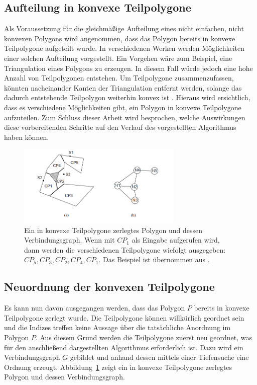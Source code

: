 \documentclass[ngerman]{seminarbeitrag}
\begin{document}
\subsection{Aufteilung in konvexe Teilpolygone}\label{aufteilung}
Als Voraussetzung für die gleichmäßige Aufteilung eines nicht einfachen, nicht konvexen Polygons wird angenommen, dass das Polygon bereits in konvexe Teilpolygone aufgeteilt wurde. In verschiedenen Werken werden Möglichkeiten einer solchen Aufteilung vorgestellt. Ein Vorgehen wäre zum Beispiel, eine Triangulation eines Polygons zu erzeugen. In diesem Fall würde jedoch eine hohe Anzahl von Teilpolygonen entstehen. Um Teilpolygone zusammenzufassen, könnten nacheinander Kanten der Triangulation entfernt werden, solange das dadurch entstehende Teilpolygon weiterhin konvex ist \cite{Schachter.1978}.
Hieraus wird ersichtlich, dass es verschiedene Möglichkeiten gibt, ein Polygon in konvexe Teilpolygone aufzuteilen. Zum Schluss dieser Arbeit wird besprochen, welche Auswirkungen diese vorbereitenden Schritte auf den Verlauf des vorgestellten Algorithmus haben können.

\begin{figure}[hb]
    \includegraphics[width=0.70\textwidth]{./Abbildungen/6.png}
    \centering
    \caption{Ein in konvexe Teilpolygone zerlegtes Polygon und dessen Verbindungsgraph. Wenn \ord mit $CP_{1}$ als Eingabe aufgerufen wird, dann werden die verschiedenen Teilpolygone wiefolgt ausgegeben: $CP_{5},CP_{3},CP_{2},CP_{4},CP_{1}$. Das Beispiel ist übernommen aus \cite{Hert.1998}.}
    \label{verbindungsgraph}
\end{figure}
\subsection{Neuordnung der konvexen Teilpolygone}\label{ordnung}

Es kann nun davon ausgegangen werden, dass das Polygon $P$ bereits in konvexe Teilpolygone \cpp zerlegt wurde. Die Teilpolygone können willkürlich geordnet sein und die Indizes treffen keine Aussage über die tatsächliche Anordnung im Polygon $P$. Aus diesem Grund werden die Teilpolygone zuerst neu geordnet, was für den anschließend dargestellten Algorithmus erforderlich ist. Dazu wird ein Verbindungsgraph $G$ gebildet und anhand dessen mittels einer Tiefensuche eine Ordnung erzeugt. Abbildung~\ref{verbindungsgraph} zeigt ein in konvexe Teilpolygone zerlegtes Polygon und dessen Verbindungsgraph.
\end{document}
